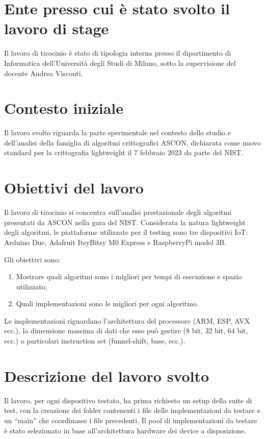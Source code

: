 \documentclass[a4paper, 12pt, italian]{extarticle}
\begin{document}
\section{Ente presso cui è stato svolto il lavoro di stage}

Il lavoro di tirocinio è stato di tipologia interna presso il dipartimento di Informatica dell'Università degli Studi di Milano, sotto la supervisione del docente Andrea Visconti.

\section{Contesto iniziale}

Il lavoro svolto riguarda la parte sperimentale nel contesto dello studio e dell'analisi della famiglia di algoritmi crittografici ASCON, dichiarata come nuovo standard per la crittografia lightweight il 7 febbraio 2023 da parte del NIST.

\section{Obiettivi del lavoro}

Il lavoro di tirocinio si concentra sull'analisi prestazionale degli algoritmi presentati da ASCON nella gara del NIST. Considerata la natura lightweight degli algoritmi, le piattaforme utilizzate per il testing sono tre dispositivi IoT: Arduino Due, Adafruit ItsyBitsy M0 Express e RaspberryPi model 3B. 

Gli obiettivi sono:
\begin{enumerate}[label=\Roman*.]
    \item Mostrare quali algoritmi sono i migliori per tempi di esecuzione e spazio utilizzato;
    \item Quali implementazioni sono le migliori per ogni algoritmo.
\end{enumerate}

Le implementazioni riguardano l'architettura del processore (ARM, ESP, AVX ecc.), la dimensione massima di dati che esso può gestire (8 bit, 32 bit, 64 bit, ecc.) o particolari instruction set (funnel-shift, base, ecc.).

\section{Descrizione del lavoro svolto}

Il lavoro, per ogni dispositivo testato, ha prima richiesto un setup della suite di test, con la creazione dei folder contenenti i file delle implementazioni da testare e un ``main'' che coordinasse i file precedenti. Il pool di implementazioni da testare è stato selezionato in base all'architettura hardware dei device a disposizione.
\end{document}
